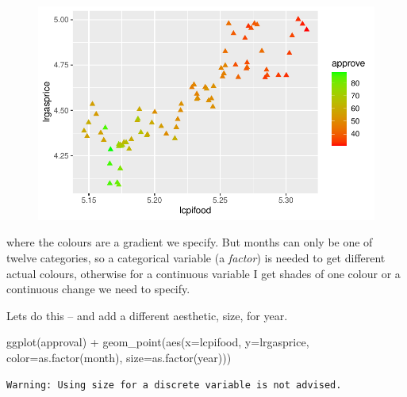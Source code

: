 \documentclass[
  letterpaper,
]{book}
\newenvironment{Shaded}{\begin{snugshade}}{\end{snugshade}}
\newcommand{\AttributeTok}[1]{\textcolor[rgb]{0.40,0.45,0.13}{#1}}
\newcommand{\FunctionTok}[1]{\textcolor[rgb]{0.28,0.35,0.67}{#1}}
\newcommand{\NormalTok}[1]{\textcolor[rgb]{0.00,0.23,0.31}{#1}}
\newcommand{\SpecialCharTok}[1]{\textcolor[rgb]{0.37,0.37,0.37}{#1}}
\begin{document}
\begin{figure}[H]

{\centering \includegraphics{Appendix1_files/figure-pdf/p2a-1.pdf}

}

\end{figure}

where the colours are a gradient we specify. But months can only be one
of twelve categories, so a categorical variable (a \emph{factor}) is
needed to get different actual colours, otherwise for a continuous
variable I get shades of one colour or a continuous change we need to
specify.

Lets do this -- and add a different aesthetic, size, for year.

\begin{Shaded}
\begin{Highlighting}[]
\FunctionTok{ggplot}\NormalTok{(approval) }\SpecialCharTok{+}
  \FunctionTok{geom\_point}\NormalTok{(}\FunctionTok{aes}\NormalTok{(}\AttributeTok{x=}\NormalTok{lcpifood, }\AttributeTok{y=}\NormalTok{lrgasprice, }\AttributeTok{color=}\FunctionTok{as.factor}\NormalTok{(month), }\AttributeTok{size=}\FunctionTok{as.factor}\NormalTok{(year)))}
\end{Highlighting}
\end{Shaded}

\begin{verbatim}
Warning: Using size for a discrete variable is not advised.
\end{verbatim}
\end{document}
